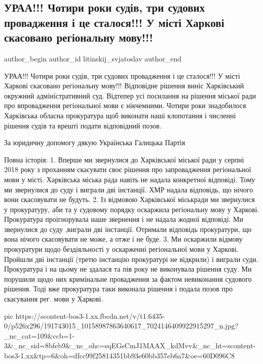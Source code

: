  
 
 
 
 
 
\subsection{УРАА!!! Чотири роки судів, три судових провадження і це сталося!!! У місті Харкові скасовано регіональну мову!!!}
\label{sec:25_05_2021.fb.litinskij_svjatoslav.1.mova_harkov_sud_jazyk}
\ifcmt
 author_begin
   author_id litinskij_svjatoslav
 author_end
\fi

УРАА!!!
Чотири роки судів, три судових провадження і це сталося!!!
У місті Харкові скасовано регіональну мову!!!
Відповідне рішення виніс Харківський окружний адміністративний суд. 
Відтепер усі посилання на рішення міської ради про впровадження регіональної мови є нікчемними.
Чотири роки знадобилося Харківська обласна прокуратура  щоб виконати наші клопотання і численні рішення судів та врешті подати відповідний позов.

За юридичну допомогу дякую Українська Галицька Партія 

Повна історія:
1. Вперше ми звернулися до Харківської міської ради у серпні 2018 року з проханням скасувати своє рішення про запровадження регіональної мови у місті.
Харківська міська рада навіть не надала конкретної відповіді.
Тому ми звернулися до суду і виграли дві інстанції.
ХМР надала відповідь, що нічого вони скасовувати не будуть.
2. Із відмовою Харківської міськради ми звернулися у прокуратуру, аби та у судовому порядку оскаржила регіональну мову у Харкові.
Прокуратура проігнорувала наше звернення і не надала жодної відповіді.
Ми звернулися до суду ,виграли дві інстанції.
Отримали відповідь прокуратури, що вона нічого скасовувати не може, а отже і не буде.
3. Ми оскаржили відмову прокуратури щодо бездіяльності у оскарженні регіональної мови у Харкові.
Пройшли дві інстанції (третю інстанцію прокуратурі не відкрили) і виграли суди.
Прокуратура і на цьому не здалася та пів року не виконувала рішення суду.
Ми порушили щодо них кримінальне провадження за фактом невиконання судового рішення.
Тоді вже прокуратура таки виконала рішення і подала позов про скасування рег. мови у Харкові.

\ifcmt
  pic https://scontent-bos3-1.xx.fbcdn.net/v/t1.6435-0/p526x296/191743015_10158987863640617_7024146409922915297_n.jpg?_nc_cat=109&ccb=1-3&_nc_sid=8bfeb9&_nc_ohc=sqEGsCmJ1MAAX_kdMvv&_nc_ht=scontent-bos3-1.xx&tp=6&oh=dfcc99f25814351bb93e60bb357eb6a7&oe=60D096C8
\fi

